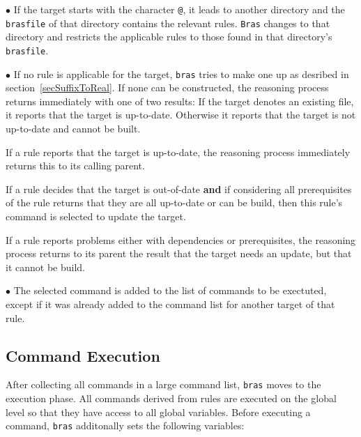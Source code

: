 \documentclass[12pt]{article}
\newcommand{\bras}{\texttt{bras}}
\newcommand{\Bras}{\texttt{Bras}}
\begin{document}
$\bullet$ If the target starts with the character \texttt{@}, it leads
to another directory and the \texttt{brasfile} of that directory
contains the relevant rules. \Bras{} changes to that
directory and restricts the applicable rules to those found in that
directory's \texttt{brasfile}.

$\bullet$ If no rule is applicable for the target, \bras{} tries to
make one up as desribed in section~\ref{secSuffixToReal}. If none can be
constructed, the reasoning process returns immediately with one of two
results: If the target denotes an existing file, it reports that the
target is up-to-date. Otherwise it reports that the target is not
up-to-date and cannot be built.

If a rule reports that the target is up-to-date,
the reasoning process immediately returns this to its calling parent.

If a rule decides that the target is out-of-date \textbf{and} if
considering all prerequisites of the rule returns that they are all
up-to-date or can be build, then this rule's command is selected to
update the target.

If a rule reports problems either with dependencies or
prerequisites, the reasoning process returns to its parent the result
that the target needs an update, but that it cannot be build.

$\bullet$ The selected command is added to the list of commands to be
exectuted, except if it was already added to the command
list for another target of that rule.

\subsection{Command Execution}
\label{secCmdExec}

After collecting all commands in a large command list, \bras{} moves
to the execution phase. All commands derived from rules are executed
on the global level so that they have access to all global
variables. Before executing a command, \bras{} additonally sets the
following variables:
\end{document}

